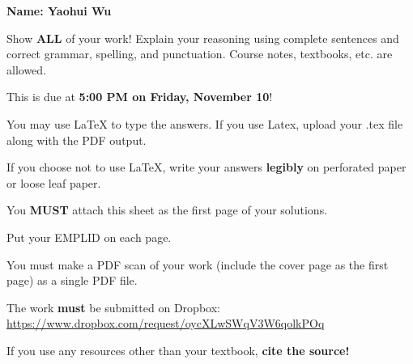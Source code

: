 \documentclass{article}
\theoremstyle{definition}
\begin{document}
\thispagestyle{empty}


 \hfill {\bf \large Name: Yaohui Wu}

\vspace{1cm}

 Show {\bf ALL} of your work! Explain your reasoning using complete sentences and correct grammar, spelling, and punctuation. Course notes, textbooks, etc. are allowed. 

\vspace{.25cm}

\noindent This is due at {\bf 5:00 PM on Friday, November 10}!

\vspace{.25cm}

\noindent You may use LaTeX to type the answers. If you use Latex, upload your .tex file along with the PDF output.

\vspace{.25cm}

\noindent If you choose not to use LaTeX, write your answers {\bf legibly} on perforated paper or loose leaf paper. 

\vspace{.25cm}

\noindent You {\bf \large MUST} attach this sheet as the first page of your solutions.

\vspace{.25cm}

\noindent Put your EMPLID on each page.

\vspace{.25cm}

 You must make a PDF scan of your work (include the cover page as the first page) as a single PDF file.

\vspace{.25cm}

\noindent The work {\bf must} be submitted on Dropbox: \href{https://www.dropbox.com/request/oycXLwSWqV3W6qolkPOq}{https://www.dropbox.com/request/oycXLwSWqV3W6qolkPOq}

\vspace{.25cm}

\noindent If you use any resources other than your textbook, {\bf cite the source!}

\vspace{.25cm}

\end{document}
